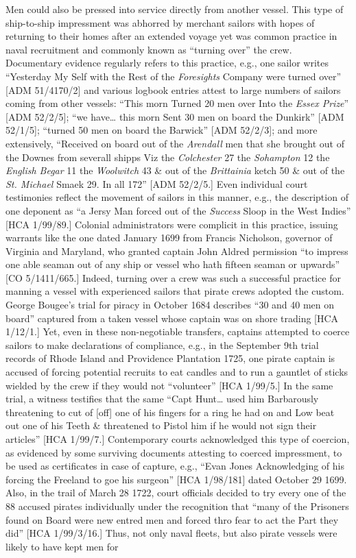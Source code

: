 \documentclass[12pt]{article}
\newenvironment{styleStandard}{\renewcommand\baselinestretch{1.0}\setlength\leftskip{0cm}\setlength\rightskip{0cm plus 1fil}\setlength\parindent{0cm}\setlength\parfillskip{0pt plus 1fil}\setlength\parskip{0in plus 1pt}\writerlistparindent\writerlistleftskip\leavevmode\normalfont\normalsize\writerlistlabel\ignorespaces}{\unskip\vspace{0in plus 1pt}\par}
\newcommand\writerlistleftskip{}
\newcommand\writerlistparindent{}
\newcommand\writerlistlabel{}
\begin{document}
\begin{styleStandard}
Men could also be pressed into service directly from another vessel. This type of ship-to-ship impressment was abhorred by merchant sailors with hopes of returning to their homes after an extended voyage yet was common practice in naval recruitment and commonly known as “turning over” the crew. Documentary evidence regularly refers to this practice, e.g., one sailor writes “Yesterday My Self with the Rest of the \textit{Foresights} Company were turned over” [ADM 51/4170/2] and various logbook entries attest to large numbers of sailors coming from other vessels: “This morn Turned 20 men over Into the \textit{Essex Prize}” [ADM 52/2/5]; “we have… this morn Sent 30 men on board the Dunkirk” [ADM 52/1/5]; “turned 50 men on board the Barwick” [ADM 52/2/3]; and more extensively, “Received on board out of the \textit{Arendall} men that she brought out of the Downes from severall shipps Viz the \textit{Colchester} 27 the \textit{Sohampton} 12 the \textit{English Begar} 11 the \textit{Woolwitch} 43 \& out of the \textit{Brittainia} ketch 50 \& out of the \textit{St. Michael} Smaek 29. In all 172” [ADM 52/2/5.] Even individual court testimonies reflect the movement of sailors in this manner, e.g., the description of one deponent as “a Jersy Man forced out of the \textit{Success} Sloop in the West Indies” [HCA 1/99/89.] Colonial administrators were complicit in this practice, issuing warrants like the one dated January 1699 from Francis Nicholson, governor of Virginia and Maryland, who granted captain John Aldred permission “to impress one able seaman out of any ship or vessel who hath fifteen seaman or upwards” [CO 5/1411/665.] Indeed, turning over a crew was such a successful practice for manning a vessel with experienced sailors that pirate crews adopted the custom. George Bougee’s trial for piracy in October 1684 describes “30 and 40 men on board” captured from a taken vessel whose captain was on shore trading [HCA 1/12/1.] Yet, even in these non-negotiable transfers, captains attempted to coerce sailors to make declarations of compliance, e.g., in the September 9th trial records of Rhode Island and Providence Plantation 1725, one pirate captain is accused of forcing potential recruits to eat candles and to run a gauntlet of sticks wielded by the crew if they would not “volunteer” [HCA 1/99/5.] In the same trial, a witness testifies that the same “Capt Hunt… used him Barbarously threatening to cut of [off] one of his fingers for a ring he had on and Low beat out one of his Teeth \& threatened to Pistol him if he would not sign their articles” [HCA 1/99/7.] Contemporary courts acknowledged this type of coercion, as evidenced by some surviving documents attesting to coerced impressment, to be used as certificates in case of capture, e.g., “Evan Jones Acknowledging of his forcing the Freeland to goe his surgeon” [HCA 1/98/181] dated October 29 1699. Also, in the trail of March 28 1722, court officials decided to try every one of the 88 accused pirates individually under the recognition that “many of the Prisoners found on Board were new entred men and forced thro fear to act the Part they did” [HCA 1/99/3/16.] Thus, not only naval fleets, but also pirate vessels were likely to have kept men for 
\end{styleStandard}
\end{document}
